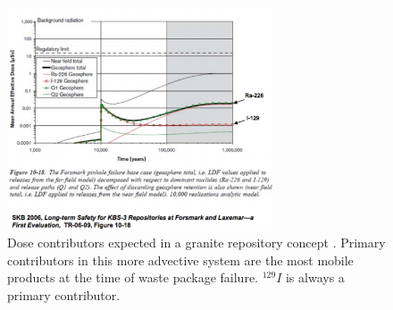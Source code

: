 \begin{figure}[htbp!]
  \begin{center}
    \includegraphics[width=0.7\textwidth]{swift_granite_dose.eps}
  \end{center}
  \caption{Dose contributors expected in a granite repository concept 
    \cite{swift_applying_2010}. Primary contributors in this more advective 
  system are the most mobile products at the time of waste package failure. 
  $^{129}I$ is always a primary contributor.}
  \label{fig:swift_granite_dose}
\end{figure}
